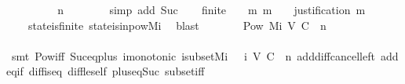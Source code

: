 \begin{isabellebody}
\ \ \ {\isachardoublequoteopen}{\isasymsigma}\ {\isasymin}\ {\isasymSigma}{\isachardoublequoteclose}\isanewline
\ \ \isamarkupfalse%
\ {\isachardoublequoteopen}n\ {\isachargreater}\ {}{\isachardoublequoteclose}\isanewline
\ \ \ \ \isamarkupfalse%
\ {\isacharparenleft}simp\ add{\isacharcolon}\ Suc{\isacharparenright}\isanewline
\ \ \isamarkupfalse%
\ {\isachardoublequoteopen}finite\ {\isasymsigma}\ {\isasymand}\ {\isacharparenleft}{\isasymforall}\ m{\isachardot}\ m\ {\isasymin}\ {\isasymsigma}\ {\isasymlongrightarrow}\ justification\ m\ {\isasymsubseteq}\ {\isasymsigma}{\isacharparenright}{\isachardoublequoteclose}\isanewline
\ \ \ \ \isamarkupfalse%
\ {\isacartoucheopen}{\isasymsigma}\ {\isasymin}\ {\isasymSigma}{\isacartoucheclose}\ state{\isacharunderscore}is{\isacharunderscore}finite\ state{\isacharunderscore}is{\isacharunderscore}in{\isacharunderscore}pow{\isacharunderscore}M{\isacharunderscore}i\ \isamarkupfalse%
\ blast\isanewline
\ \ \isamarkupfalse%
\ \isamarkupfalse%
\ {\isachardoublequoteopen}{\isasymsigma}\ {\isasymin}\ Pow\ {\isacharparenleft}M{\isacharunderscore}i\ {\isacharparenleft}V{\isacharcomma}\ C{\isacharcomma}\ {\isasymepsilon}{\isacharparenright}\ {\isacharparenleft}n\ {\isacharminus}\ {}{\isacharparenright}{\isacharparenright}{\isachardoublequoteclose}\isanewline
\ \ \ \ \isamarkupfalse%
\ {\isacartoucheopen}{\isasymsigma}\ {\isasymsubseteq}\ {\isasymsigma}{\isacharprime}{\isacartoucheclose}\isanewline
\ \ \ \ \isamarkupfalse%
\ {\isacharparenleft}smt\ Pow{\isacharunderscore}iff\ Suc{\isacharunderscore}eq{\isacharunderscore}plus{}\ {\isasymSigma}i{\isacharunderscore}monotonic\ {\isasymSigma}i{\isacharunderscore}subset{\isacharunderscore}Mi\ {\isacartoucheopen}{\isasymsigma}{\isacharprime}\ {\isasymin}\ {\isasymSigma}{\isacharunderscore}i\ {\isacharparenleft}V{\isacharcomma}\ C{\isacharcomma}\ {\isasymepsilon}{\isacharparenright}\ n{\isacartoucheclose}\ add{\isacharunderscore}diff{\isacharunderscore}cancel{\isacharunderscore}left{\isacharprime}\ add{\isacharunderscore}eq{\isacharunderscore}if\ diff{\isacharunderscore}is{\isacharunderscore}{}{\isacharunderscore}eq\ diff{\isacharunderscore}le{\isacharunderscore}self\ plus{\isacharunderscore}{}{\isacharunderscore}eq{\isacharunderscore}Suc\ subset{\isacharunderscore}iff{\isacharparenright}\isanewline
\ \ \isamarkupfalse%
\ \isamarkupfalse%

\end{isabellebody}
